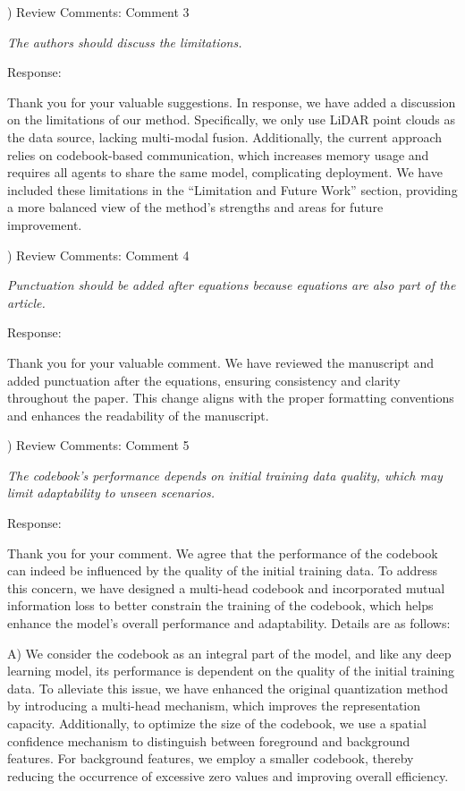 \documentclass[12pt,a4paper]{article}
\begin{document}
\vspace{4ex}

) Review Comments: Comment 3

\textit{The authors should discuss the limitations.}

\noindent Response:

Thank you for your valuable suggestions. In response, we have added a discussion on the limitations of our method. Specifically, we only use LiDAR point clouds as the data source, lacking multi-modal fusion. Additionally, the current approach relies on codebook-based communication, which increases memory usage and requires all agents to share the same model, complicating deployment. We have included these limitations in the ``Limitation and Future Work'' section, providing a more balanced view of the method's strengths and areas for future improvement.

\vspace{4ex}

) Review Comments: Comment 4

\textit{Punctuation should be added after equations because equations are also part of the article.}

\noindent Response:

Thank you for your valuable comment. We have reviewed the manuscript and added punctuation after the equations, ensuring consistency and clarity throughout the paper. This change aligns with the proper formatting conventions and enhances the readability of the manuscript.

\vspace{4ex}
) Review Comments: Comment 5

\textit{The codebook's performance depends on initial training data quality, which may limit adaptability to unseen scenarios.}

\noindent Response:

Thank you for your comment. We agree that the performance of the codebook can indeed be influenced by the quality of the initial training data. To address this concern, we have designed a multi-head codebook and incorporated mutual information loss to better constrain the training of the codebook, which helps enhance the model's overall performance and adaptability. 
Details are as follows:

A)  We consider the codebook as an integral part of the model, and like any deep learning model, its performance is dependent on the quality of the initial training data. To alleviate this issue, we have enhanced the original quantization method by introducing a multi-head mechanism, which improves the representation capacity. Additionally, to optimize the size of the codebook, we use a spatial confidence mechanism to distinguish between foreground and background features. For background features, we employ a smaller codebook, thereby reducing the occurrence of excessive zero values and improving overall efficiency.
\end{document}
